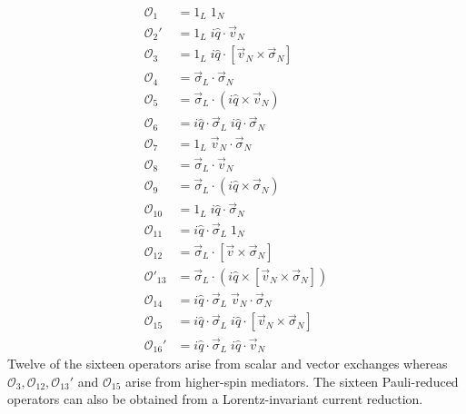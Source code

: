 \documentclass{book}[letterpaper,12pt]
\begin{document}
\begin{equation}
\begin{split}
\mathcal{O}_1&=1_L\;1_N\\
\mathcal{O}_2'&=1_L\;i\hat{q}\cdot\vec{v}_N\\
\mathcal{O}_3&=1_L\;i\hat{q}\cdot\left[\vec{v}_N\times\vec{\sigma}_N\right]\\
\mathcal{O}_4&=\vec{\sigma}_L\cdot\vec{\sigma}_N\\
\mathcal{O}_5&=\vec{\sigma}_L\cdot\left(i\hat{q}\times\vec{v}_N\right)\\
\mathcal{O}_6&=i\hat{q}\cdot\vec{\sigma}_L\;i\hat{q}\cdot\vec{\sigma}_N\\
\mathcal{O}_7&=1_L\;\vec{v}_N\cdot\vec{\sigma}_N\\
\mathcal{O}_8&=\vec{\sigma}_L\cdot\vec{v}_N\\
\mathcal{O}_9&=\vec{\sigma}_L\cdot\left(i\hat{q}\times\vec{\sigma}_N\right)\\
\mathcal{O}_{10}&=1_L\;i\hat{q}\cdot\vec{\sigma}_N\\
\mathcal{O}_{11}&=i\hat{q}\cdot\vec{\sigma}_L\;1_N\\
\mathcal{O}_{12}&=\vec{\sigma}_L\cdot\left[\vec{v}\times\vec{\sigma}_N\right]\\
\mathcal{O}'_{13}&=\vec{\sigma}_L\cdot\left(i\hat{q}\times\left[\vec{v}_N\times\vec{\sigma}_N\right]\right)\\
\mathcal{O}_{14}&=i\hat{q}\cdot\vec{\sigma}_L\;\vec{v}_N\cdot\vec{\sigma}_N\\
\mathcal{O}_{15}&=i\hat{q}\cdot\vec{\sigma}_L\;i\hat{q}\cdot\left[\vec{v}_N\times\vec{\sigma}_N\right]\\
\mathcal{O}_{16}'&=i\hat{q}\cdot\vec{\sigma}_L\;i\hat{q}\cdot\vec{v}_N
\end{split}
\label{eq:basis_NRET}
\end{equation}
Twelve of the sixteen operators arise from scalar and vector exchanges whereas $\mathcal{O}_3,\mathcal{O}_{12},\mathcal{O}_{13}'$ and $\mathcal{O}_{15}$ arise from higher-spin mediators. The sixteen Pauli-reduced operators can also be obtained from a Lorentz-invariant current reduction.
\end{document}
